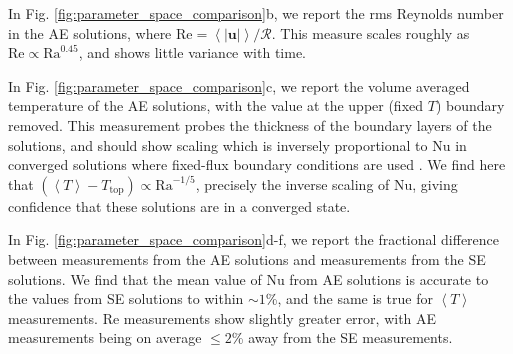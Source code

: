 \documentclass[aps, pre, onecolumn, nofootinbib, notitlepage, groupedaddress, amsfonts, amssymb, amsmath, longbibliography]{revtex4-1}
\newcommand{\angles}[1]{\ensuremath{\left\langle #1 \right\rangle}}
\begin{document}
In Fig. \ref{fig:parameter_space_comparison}b, we report the rms Reynolds number
in the AE solutions, where
$\text{Re} = \angles{|\bm{u}|} / \mathcal{R}$.  This measure scales roughly as
$\text{Re} \propto \text{Ra}^{0.45}$, and shows little variance with time.

In Fig. \ref{fig:parameter_space_comparison}c, we report the volume averaged 
temperature of the AE solutions, with the value at the upper (fixed $T$) boundary removed.
This measurement probes the thickness of the boundary layers of the solutions, and
should show scaling which is inversely proportional to Nu in converged solutions
where fixed-flux boundary conditions are used \cite{otero&all2002}.  We find here
that $(\angles{T} - T_{\text{top}}) \propto \text{Ra}^{-1/5}$, precisely the inverse
scaling of Nu, giving confidence that these solutions are in a converged state.

In Fig. \ref{fig:parameter_space_comparison}d-f, we report the fractional difference
between measurements from the AE solutions and measurements from the SE solutions.
We find that the mean value of Nu from AE solutions is accurate to the values
from SE solutions to within $\sim 1$\%, and the same is true for $\angles{T}$ measurements.
Re measurements show slightly greater error, with AE measurements being on average
$\leq 2$\% away from the SE measurements. 
\end{document}
